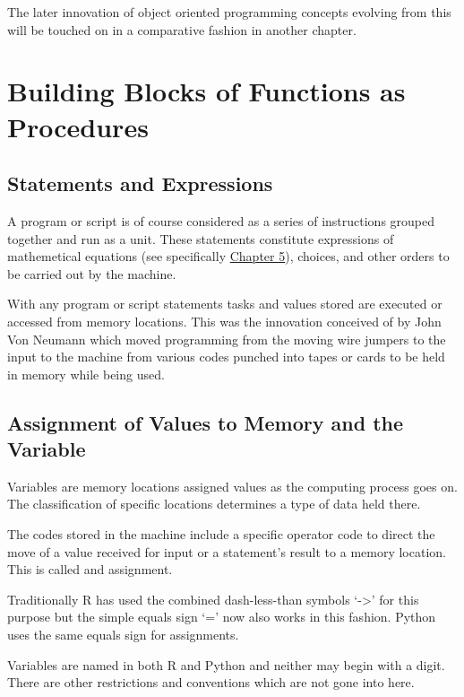 \documentclass[]{book}
\theoremstyle{definition}
\theoremstyle{definition}
\theoremstyle{definition}
\theoremstyle{remark}
\begin{document}
The later innovation of object oriented programming concepts evolving
from this will be touched on in a comparative fashion in another
chapter.

\section{Building Blocks of Functions as
Procedures}\label{building-blocks-of-functions-as-procedures}

\subsection{Statements and
Expressions}\label{statements-and-expressions}

A program or script is of course considered as a series of instructions
grouped together and run as a unit. These statements constitute
expressions of mathemetical equations (see specifically \href{}{Chapter
5}), choices, and other orders to be carried out by the machine.

With any program or script statements tasks and values stored are
executed or accessed from memory locations. This was the innovation
conceived of by John Von Neumann which moved programming from the moving
wire jumpers to the input to the machine from various codes punched into
tapes or cards to be held in memory while being used.

\subsection{Assignment of Values to Memory and the
Variable}\label{assignment-of-values-to-memory-and-the-variable}

Variables are memory locations assigned values as the computing process
goes on. The classification of specific locations determines a type of
data held there.

The codes stored in the machine include a specific operator code to
direct the move of a value received for input or a statement's result to
a memory location. This is called and assignment.

Traditionally R has used the combined dash-less-than symbols
`-\textgreater{}' for this purpose but the simple equals sign `=' now
also works in this fashion. Python uses the same equals sign for
assignments.

Variables are named in both R and Python and neither may begin with a
digit. There are other restrictions and conventions which are not gone
into here.
\end{document}
